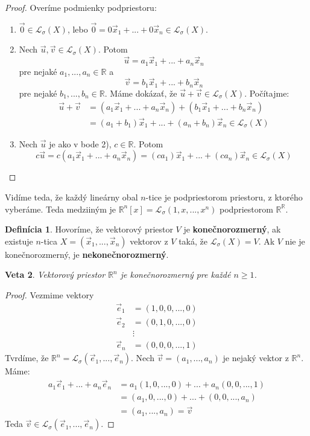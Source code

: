 \documentclass[11pt,a4paper]{article}
\theoremstyle{definition}
\newtheorem{definicia}{Definícia}[section]
\theoremstyle{plain}
\newtheorem{veta}[definicia]{Veta}
\theoremstyle{remark}
\newcommand{\R}{\mathbb{R}}
\newcommand{\Lo}{\mathcal{L}_\sigma} %
\begin{document}
\begin{proof}
Overíme podmienky podpriestoru:
\begin{enumerate}
    \item $\vec{0}\in \Lo(X)$, lebo $\vec{0}=0\vec{x}_{1}+...+0\vec{x}_{n}\in \Lo(X)$.
    \item Nech $\vec{u}, \vec{v} \in \Lo(X)$. Potom
    $$ \vec{u}=a_{1}\vec{x}_{1}+...+a_{n}\vec{x}_{n} $$
    pre nejaké $a_{1},...,a_{n}\in \R$ a
    $$ \vec{v}=b_{1}\vec{x}_{1}+...+b_{n}\vec{x}_{n} $$
    pre nejaké $b_{1},...,b_{n}\in \R$.
    Máme dokázať, že $\vec{u}+\vec{v}\in \Lo(X)$. Počítajme:
    \begin{align*}
    \vec{u}+\vec{v} &= (a_{1}\vec{x}_{1}+...+a_{n}\vec{x}_{n}) + (b_{1}\vec{x}_{1}+...+b_{n}\vec{x}_{n}) \\
    &= (a_{1}+b_{1})\vec{x}_{1}+...+(a_{n}+b_{n})\vec{x}_{n}\in \Lo(X)
    \end{align*}
    \item Nech $\vec{u}$ je ako v bode 2), $c\in \R$. Potom
    $$ c\vec{u}=c(a_{1}\vec{x}_{1}+...+a_{n}\vec{x}_{n})=(ca_{1})\vec{x}_{1}+...+(ca_{n})\vec{x}_{n}\in \Lo(X) $$
\end{enumerate}
\end{proof}

Vidíme teda, že každý lineárny obal $n$-tice je podpriestorom priestoru, z ktorého vyberáme. Teda medziiným je $\R^{n}[x]=\Lo(1,x,...,x^{n})$ podpriestorom $\R^{\R}$.

\begin{definicia} \label{def:10.3}
Hovoríme, že vektorový priestor $V$ je \textbf{konečnorozmerný}, ak existuje $n$-tica $X=(\vec{x}_{1},...,\vec{x}_{n})$ vektorov z $V$ taká, že $\Lo(X)=V$. Ak $V$ nie je konečnorozmerný, je \textbf{nekonečnorozmerný}.
\end{definicia}

\begin{veta} \label{veta:10.4}
Vektorový priestor $\R^{n}$ je konečnorozmerný pre každé $n \ge 1$.
\end{veta}

\begin{proof}
Vezmime vektory
\begin{align*}
\vec{e}_{1} &= (1,0,0,...,0) \\
\vec{e}_{2} &= (0,1,0,...,0) \\
&\vdots \\
\vec{e}_{n} &= (0,0,0,...,1)
\end{align*}
Tvrdíme, že $\R^n = \Lo(\vec{e}_1, ..., \vec{e}_n)$. Nech $\vec{v}=(a_{1},...,a_{n})$ je nejaký vektor z $\R^{n}$. Máme:
\begin{align*}
a_{1}\vec{e}_{1}+...+a_{n}\vec{e}_{n} &= a_{1}(1,0,...,0)+...+a_{n}(0,0,...,1) \\
&= (a_{1},0,...,0)+...+(0,0,...,a_{n}) \\
&= (a_{1},...,a_{n})=\vec{v}
\end{align*}
Teda $\vec{v} \in \Lo(\vec{e}_{1},...,\vec{e}_{n})$.
\end{proof}
\end{document}
